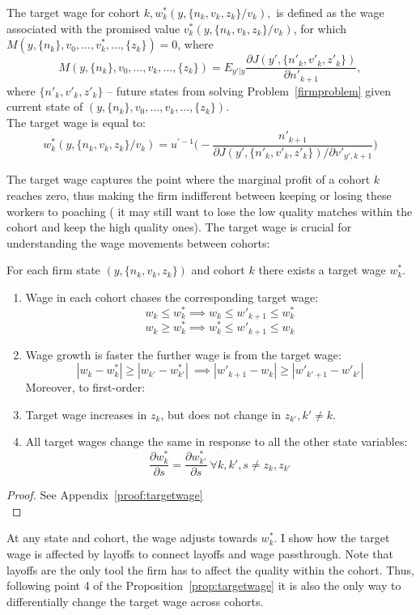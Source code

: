  \begin{definition} 
  The target wage for cohort $k, w^*_k(y,\{n_k,v_k,z_k\}/v_k),$ is defined as the wage associated with the promised value $v^*_k(y,\{n_k,v_k,z_k\}/v_k)$, for which $M(y,\{n_k\},v_0,...,v^*_k,...,\{z_k\})=0$, where
  \[M(y,\{n_k\},v_0,...,v_k,...,\{z_k\}) = E_{y'|y}\frac{\partial J(y',\{n'_k,v'_k,z'_k\})}{\partial n'_{k+1}},\]
  where $\{n'_k,v'_k,z'_k\}$ -- future states from solving Problem~\ref{firmproblem} given current state of $(y,\{n_k\},v_0,...,v_k,...,\{z_k\})$. \\
  The target wage is equal to:
  \[ w^*_k (y,\{n_k,v_k,z_k\}/v_k) = u^{'-1}\Big( - \frac{n'_{k+1}}{\partial J(y',\{n'_k,v'_k,z'_k\})/\partial v'_{y',k+1}} \Big)\]
 \end{definition}
The target wage captures the point where the marginal profit of a cohort $k$ reaches zero, thus making the firm indifferent between keeping or losing these workers to poaching ( it may still want to lose the low quality matches within the cohort and keep the high quality ones). The target wage is crucial for understanding the wage movements between cohorts:
\begin{proposition} \label{prop:targetwage}
 For each firm state $(y,\{n_k,v_k,z_k\})$ and cohort $k$ there exists a target wage $w^*_k$. 
  \begin{enumerate}
    \item Wage in each cohort chases the corresponding target wage: 
    \[ w_k \leq w^*_k  \implies w_k \leq w'_{k+1} \leq w^*_k\]
    \[w_k \geq w^*_k  \implies w^*_k \leq w'_{k+1} \leq w_k\]
    \item Wage growth is faster the further wage is from the target wage:
    \[|w_k-w^*_k|\geq|w_{k'}-w^*_{k'}|\: \implies |w'_{k+1}-w_k|\geq|w'_{k'+1}-w'_{k'}| \]
    Moreover, to first-order:
    \item Target wage increases in $z_k$, but does not change in $z_{k'},k'\neq k$.
    \item All target wages change the same in response to all the other state variables:
    \[\frac{\partial w^*_k}{\partial s} = \frac{\partial w^*_{k'}}{\partial s}\:  \forall k,k', s\neq z_k,z_{k'}\]
  \end{enumerate}
\end{proposition}
\begin{proof}
  See Appendix~\ref{proof:targetwage} \\

\end{proof}
At any state and cohort, the wage adjusts towards $w^*_k$. I show how the target wage is affected by layoffs to connect layoffs and wage passthrough. Note that layoffs are the only tool the firm has to affect the quality within the cohort. Thus, following point 4 of the Proposition~\ref{prop:targetwage} it is also the only way to differentially change the target wage across cohorts.

